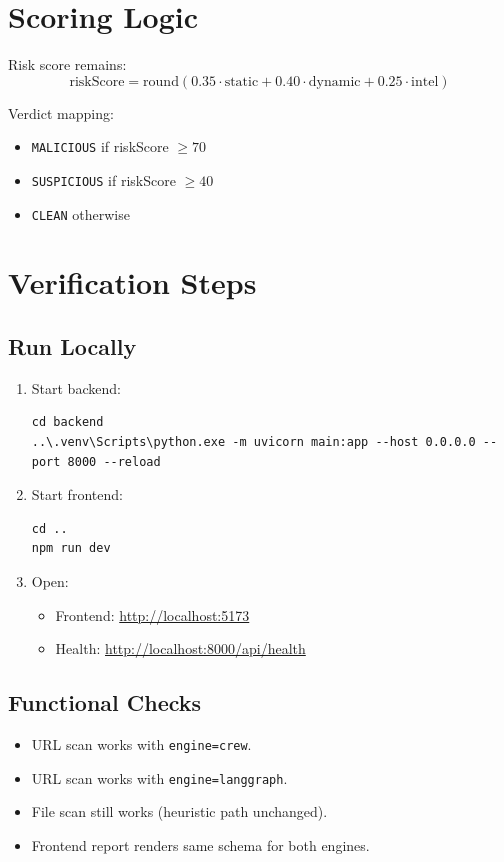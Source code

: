 \documentclass[11pt,a4paper]{article}
\begin{document}
\section{Scoring Logic}
Risk score remains:
\[
\text{riskScore} = \mathrm{round}(0.35 \cdot \text{static} + 0.40 \cdot \text{dynamic} + 0.25 \cdot \text{intel})
\]

Verdict mapping:
\begin{itemize}[leftmargin=1.25em]
  \item \texttt{MALICIOUS} if riskScore $\geq 70$
  \item \texttt{SUSPICIOUS} if riskScore $\geq 40$
  \item \texttt{CLEAN} otherwise
\end{itemize}

\section{Verification Steps}
\subsection*{Run Locally}
\begin{enumerate}[leftmargin=1.5em]
  \item Start backend:
  \begin{lstlisting}[style=code]
cd backend
..\.venv\Scripts\python.exe -m uvicorn main:app --host 0.0.0.0 --port 8000 --reload
  \end{lstlisting}

  \item Start frontend:
  \begin{lstlisting}[style=code]
cd ..
npm run dev
  \end{lstlisting}

  \item Open:
  \begin{itemize}[leftmargin=1.25em]
    \item Frontend: \url{http://localhost:5173}
    \item Health: \url{http://localhost:8000/api/health}
  \end{itemize}
\end{enumerate}

\subsection*{Functional Checks}
\begin{itemize}[leftmargin=1.25em]
  \item URL scan works with \texttt{engine=crew}.
  \item URL scan works with \texttt{engine=langgraph}.
  \item File scan still works (heuristic path unchanged).
  \item Frontend report renders same schema for both engines.
\end{itemize}
\end{document}
